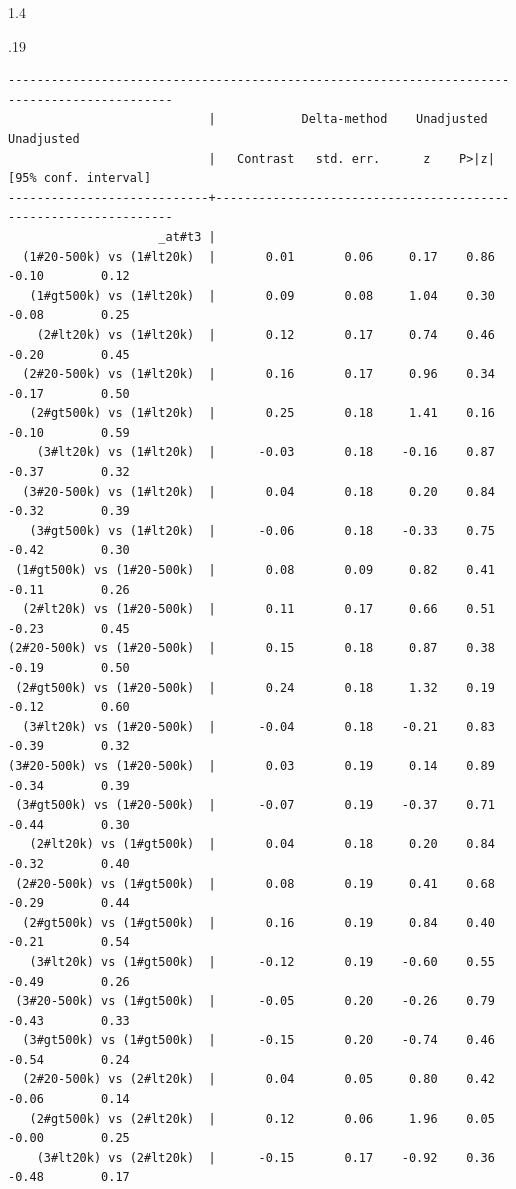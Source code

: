 \documentclass[10pt, letterpaper]{article}
\begin{document}
\begin{spacing}{1.4}
\begin{scriptsize}
\begin{spacing}{.19}
\begin{verbatim}
---------------------------------------------------------------------------------------------
                            |            Delta-method    Unadjusted           Unadjusted
                            |   Contrast   std. err.      z    P>|z|     [95% conf. interval]
----------------------------+----------------------------------------------------------------
                     _at#t3 |
  (1#20-500k) vs (1#lt20k)  |       0.01       0.06     0.17    0.86        -0.10        0.12
   (1#gt500k) vs (1#lt20k)  |       0.09       0.08     1.04    0.30        -0.08        0.25
    (2#lt20k) vs (1#lt20k)  |       0.12       0.17     0.74    0.46        -0.20        0.45
  (2#20-500k) vs (1#lt20k)  |       0.16       0.17     0.96    0.34        -0.17        0.50
   (2#gt500k) vs (1#lt20k)  |       0.25       0.18     1.41    0.16        -0.10        0.59
    (3#lt20k) vs (1#lt20k)  |      -0.03       0.18    -0.16    0.87        -0.37        0.32
  (3#20-500k) vs (1#lt20k)  |       0.04       0.18     0.20    0.84        -0.32        0.39
   (3#gt500k) vs (1#lt20k)  |      -0.06       0.18    -0.33    0.75        -0.42        0.30
 (1#gt500k) vs (1#20-500k)  |       0.08       0.09     0.82    0.41        -0.11        0.26
  (2#lt20k) vs (1#20-500k)  |       0.11       0.17     0.66    0.51        -0.23        0.45
(2#20-500k) vs (1#20-500k)  |       0.15       0.18     0.87    0.38        -0.19        0.50
 (2#gt500k) vs (1#20-500k)  |       0.24       0.18     1.32    0.19        -0.12        0.60
  (3#lt20k) vs (1#20-500k)  |      -0.04       0.18    -0.21    0.83        -0.39        0.32
(3#20-500k) vs (1#20-500k)  |       0.03       0.19     0.14    0.89        -0.34        0.39
 (3#gt500k) vs (1#20-500k)  |      -0.07       0.19    -0.37    0.71        -0.44        0.30
   (2#lt20k) vs (1#gt500k)  |       0.04       0.18     0.20    0.84        -0.32        0.40
 (2#20-500k) vs (1#gt500k)  |       0.08       0.19     0.41    0.68        -0.29        0.44
  (2#gt500k) vs (1#gt500k)  |       0.16       0.19     0.84    0.40        -0.21        0.54
   (3#lt20k) vs (1#gt500k)  |      -0.12       0.19    -0.60    0.55        -0.49        0.26
 (3#20-500k) vs (1#gt500k)  |      -0.05       0.20    -0.26    0.79        -0.43        0.33
  (3#gt500k) vs (1#gt500k)  |      -0.15       0.20    -0.74    0.46        -0.54        0.24
  (2#20-500k) vs (2#lt20k)  |       0.04       0.05     0.80    0.42        -0.06        0.14
   (2#gt500k) vs (2#lt20k)  |       0.12       0.06     1.96    0.05        -0.00        0.25
    (3#lt20k) vs (2#lt20k)  |      -0.15       0.17    -0.92    0.36        -0.48        0.17

\end{verbatim}
\end{spacing}
\end{scriptsize}
\end{spacing}
\end{document}
